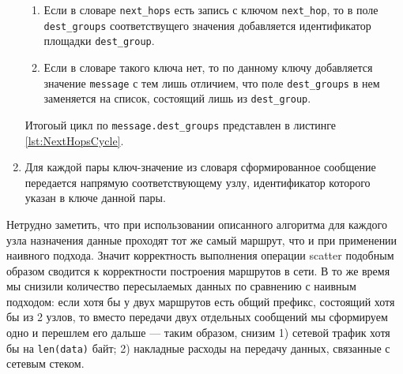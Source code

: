 \begin{enumerate}
\begin{enumerate}
        \item Если в словаре \texttt{next\_hops} есть запись с ключом \texttt{next\_hop}, то в поле \texttt{dest\_groups} соответствущего значения добавляется идентификатор площадки \texttt{dest\_group}.
        
        \item Если в словаре такого ключа нет, то по данному ключу добавляется значение \texttt{message} с тем лишь отличием, что поле \texttt{dest\_groups} в нем заменяется на список, состоящий лишь из \texttt{dest\_group}.
    \end{enumerate}
    
    Итогоый цикл по \texttt{message.dest\_groups} представлен в листинге \ref{lst:NextHopsCycle}.
    
        
    \item Для каждой пары ключ-значение из словаря сформированное сообщение передается напрямую соответствующему узлу, идентификатор которого указан в ключе данной пары.
\end{enumerate}

Нетрудно заметить, что при использовании описанного алгоритма для каждого узла назначения данные проходят тот же самый маршрут, что и при применении наивного подхода. Значит корректность выполнения операции scatter подобным образом сводится к корректности построения маршрутов в сети. В то же время мы снизили количество пересылаемых данных по сравнению с наивным подходом: если хотя бы у двух маршрутов есть общий префикс, состоящий хотя бы из 2 узлов, то вместо передачи двух отдельных сообщений мы сформируем одно и перешлем его дальше --- таким образом, снизим 1) сетевой трафик хотя бы на \texttt{len(data)} байт; 2) накладные расходы на передачу данных, связанные с сетевым стеком.

